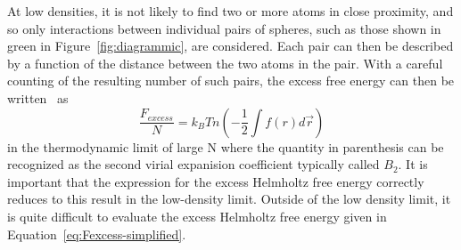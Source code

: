 \documentclass[double,12pt]{beavtex}
\begin{document}
At low densities, it is not likely to find two or more atoms in close 
proximity, and so only interactions between individual pairs of spheres, 
such as those shown in green in Figure~\ref{fig:diagrammic}, are considered.
Each pair can then be described by a function of the distance between the 
two atoms in the pair. 
With a careful counting of the resulting number of such pairs, the excess 
free energy can then be written~\cite{schroeder} as
\begin{equation}\label{eq:Fexcess}{\frac{F_{excess}}{N}=k_BTn\left(-\frac{1}{2}\int{f(r)}{d\vec{r}}\right)}\end{equation} 
in the thermodynamic limit of large N 
where the quantity in parenthesis can be recognized 
as the second virial expanision coefficient typically called $B_2$. 
It is important that the expression for the excess Helmholtz free energy 
correctly reduces to this result in the low-density limit. 
Outside of the low density limit, it is quite difficult to evaluate the 
excess Helmholtz free energy given in Equation~\ref{eq:Fexcess-simplified}. 

\end{document}
